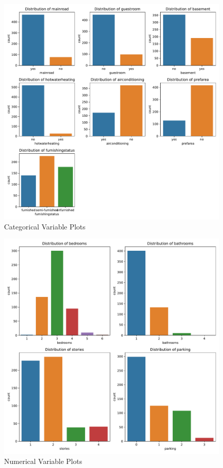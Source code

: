 \documentclass[12pt]{article}
\begin{document}
\begin{figure}
    \centering
    \includegraphics[width=1\textwidth]{categorical_plots.pdf}
    \caption{Categorical Variable Plots}
    \label{fig:categorical_plots}
\end{figure}

\begin{figure}
    \centering
    \includegraphics[width=1\textwidth]{numerical_plots.pdf}
    \caption{Numerical Variable Plots}
    \label{fig:numberical_plots}
\end{figure}
\end{document}
